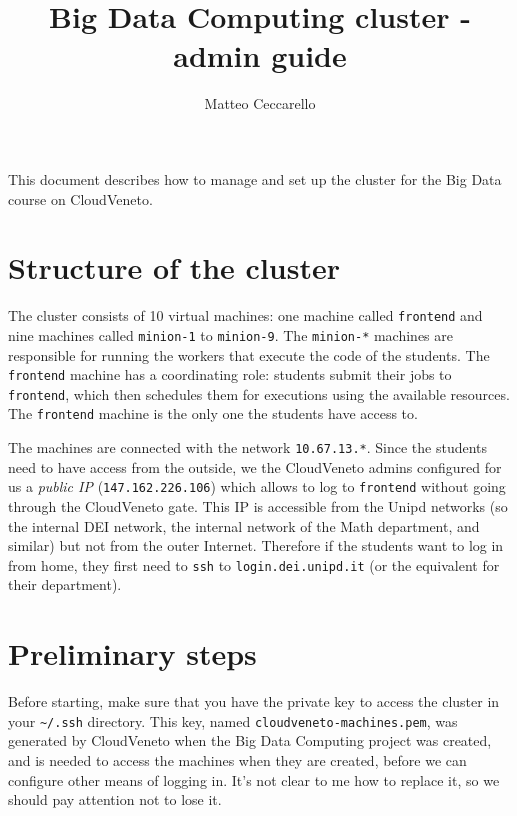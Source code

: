 \documentclass[justified]{tufte-handout}
\title{Big Data Computing cluster - admin guide}
\author{Matteo Ceccarello}
\date{}
\begin{document}
\maketitle

{
\setcounter{tocdepth}{3}
\tableofcontents
}

\vspace{1em}

This document describes how to manage and set up the cluster for the Big
Data course on CloudVeneto.

\section{Structure of the cluster}\label{structure-of-the-cluster}

The cluster consists of 10 virtual machines: one machine called
\texttt{frontend} and nine machines called \texttt{minion-1} to
\texttt{minion-9}. The \texttt{minion-*} machines are responsible for
running the workers that execute the code of the students. The
\texttt{frontend} machine has a coordinating role: students submit their
jobs to \texttt{frontend}, which then schedules them for executions
using the available resources. The \texttt{frontend} machine is the only
one the students have access to.

The machines are connected with the network \texttt{10.67.13.*}. Since
the students need to have access from the outside, we the CloudVeneto
admins configured for us a \emph{public IP} (\texttt{147.162.226.106})
which allows to log to \texttt{frontend} without going through the
CloudVeneto gate. This IP is accessible from the Unipd networks (so the
internal DEI network, the internal network of the Math department, and
similar) but not from the outer Internet. Therefore if the students want
to log in from home, they first need to \texttt{ssh} to
\texttt{login.dei.unipd.it} (or the equivalent for their department).

\section{Preliminary steps}\label{preliminary-steps}

Before starting, make sure that you have the private key to access the
cluster in your \texttt{\textasciitilde{}/.ssh} directory. This key,
named \texttt{cloudveneto-machines.pem}, was generated by CloudVeneto
when the Big Data Computing project was created, and is needed to access
the machines when they are created, before we can configure other means
of logging in. It's not clear to me how to replace it, so we should pay
attention not to lose it.
\end{document}
